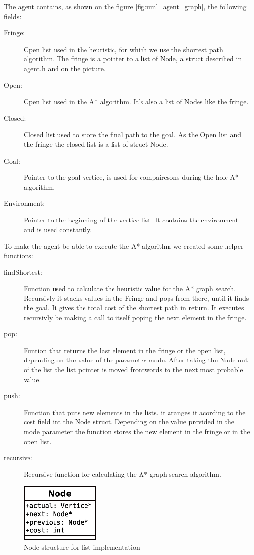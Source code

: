 The agent contains, as shown on the figure \ref{fig:uml_agent_graph}, the following fields:\\
\begin{description}
\item[Fringe:]Open list used in the heuristic, for which we use the shortest path algorithm. The fringe is a pointer to a list of Node, 
a struct described in agent.h and on the picture.
\item[Open:]Open list used in the A* algorithm. It's also a list of Nodes like the fringe.
\item[Closed:]Closed list used to store the final path to the goal. As the Open list and the fringe the closed list is a list of struct Node.
\item[Goal:]Pointer to the goal vertice, is used for compairesons during the hole A* algorithm.
\item[Environment:]Pointer to the beginning of the vertice list. It contains the  environment and is used constantly.
\end{description}

To make the agent be able to execute the A* algorithm we created some helper functions:\\

\begin{description}
\item[findShortest:]Function used to calculate the heuristic value for the A* graph search. Recursivly it stacks values in the Fringe 
and pops from there, until it finds the goal. It gives the total cost of the shortest path in return. It executes recursivly be making a call 
to itself poping the next element in the fringe.
\item[pop:]Funtion that returns the last element in the fringe or the open list, depending on the value of the parameter mode. After 
taking the Node out of the list the list pointer is moved frontwords to the next most probable value.
\item[push:]Function that puts new elements in the lists, it aranges it acording to the cost field int the Node struct. Depending on the 
value provided in the mode parameter the function stores the new element in the fringe or in the open list.
\item[recursive:]Recursive function for calculating the A* graph search algorithm.
\end{description}


\begin{figure}[h]\centering
\includegraphics[width=0.35\textwidth]{pictures/uml_node}
\caption{Node structure for list implementation}
\label{fig:node}
\end{figure}



